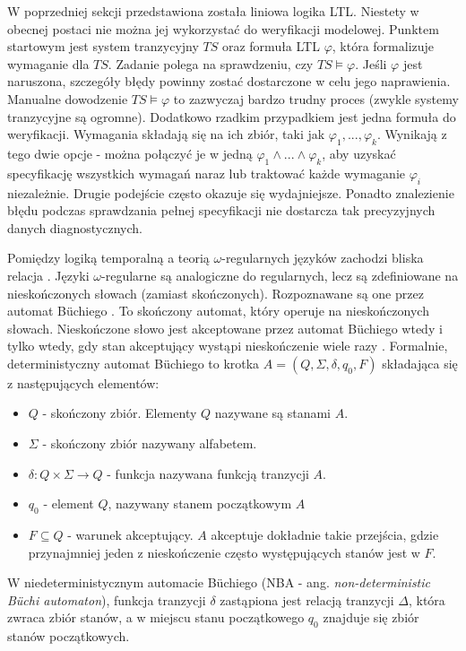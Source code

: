 W poprzedniej sekcji przedstawiona została liniowa logika LTL.
Niestety w obecnej postaci nie można jej wykorzystać do weryfikacji modelowej.
Punktem startowym jest system tranzycyjny $TS$ oraz formuła LTL $\varphi$, która formalizuje wymaganie dla $TS$.
Zadanie polega na sprawdzeniu, czy $TS \models \varphi$.
Jeśli $\varphi$ jest naruszona, szczegóły błędy powinny zostać dostarczone w celu jego naprawienia.
Manualne dowodzenie $TS \models \varphi$ to zazwyczaj bardzo trudny proces (zwykle systemy tranzycyjne są ogromne).
Dodatkowo rzadkim przypadkiem jest jedna formuła do weryfikacji.
Wymagania składają się na ich zbiór, taki jak $\varphi_1,...,\varphi_k$.
Wynikają z tego dwie opcje - można połączyć je w jedną $\varphi_1 \land ... \land \varphi_k$, aby uzyskać specyfikację wszystkich wymagań naraz lub traktować każde wymaganie $\varphi_i$ niezależnie.
Drugie podejście często okazuje się wydajniejsze.
Ponadto znalezienie błędu podczas sprawdzania pełnej specyfikacji nie dostarcza tak precyzyjnych danych diagnostycznych.

Pomiędzy logiką temporalną a teorią $\omega$-regularnych języków zachodzi bliska relacja \cite{Sis83}\cite{Wol83}.
Języki $\omega$-regularne są analogiczne do regularnych, lecz są zdefiniowane na nieskończonych słowach (zamiast skończonych).
Rozpoznawane są one przez automat Büchiego \cite{Buch66}.
To skończony automat, który operuje na nieskończonych słowach.
Nieskończone słowo jest akceptowane przez automat Büchiego wtedy i tylko wtedy, gdy stan akceptujący wystąpi nieskończenie wiele razy \cite{Sis87}.
Formalnie, deterministyczny automat Büchiego to krotka $A = (Q,\Sigma,\delta,q_0,F)$ składająca się z następujących elementów:
\begin{itemize}
\item $Q$ - skończony zbiór. Elementy $Q$ nazywane są stanami $A$.
\item $\Sigma$ - skończony zbiór nazywany alfabetem.
\item $\delta: Q \times \Sigma \rightarrow Q$ - funkcja nazywana funkcją tranzycji $A$.
\item $q_0$ - element $Q$, nazywany stanem początkowym $A$
\item $F \subseteq Q$ - warunek akceptujący. $A$ akceptuje dokładnie takie przejścia, gdzie przynajmniej jeden z nieskończenie często występujących stanów jest w $F$.
\end{itemize}
W niedeterministycznym automacie Büchiego (NBA - ang. \textit{non-deterministic Büchi automaton}), funkcja tranzycji $\delta$ zastąpiona jest relacją tranzycji $\Delta$, która zwraca zbiór stanów, a w miejscu stanu początkowego $q_0$ znajduje się zbiór stanów początkowych.

